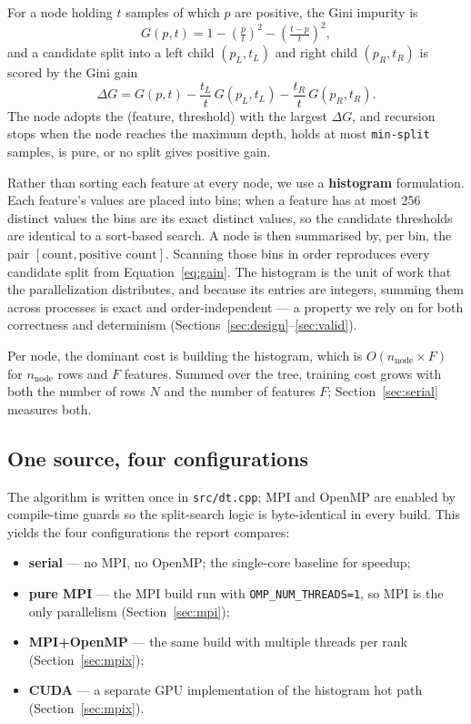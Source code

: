 \documentclass[11pt]{article}
\begin{document}
For a node holding $t$ samples of which $p$ are positive, the Gini impurity is
\begin{equation}
G(p,t) = 1 - \left(\tfrac{p}{t}\right)^2 - \left(\tfrac{t-p}{t}\right)^2 ,
\end{equation}
and a candidate split into a left child $(p_L,t_L)$ and right child $(p_R,t_R)$ is scored by the Gini gain
\begin{equation}
\Delta G = G(p,t) - \frac{t_L}{t}\,G(p_L,t_L) - \frac{t_R}{t}\,G(p_R,t_R).
  \label{eq:gain}
\end{equation}
The node adopts the (feature, threshold) with the largest $\Delta G$, and recursion stops when the node reaches the maximum depth, holds at most \texttt{min-split} samples, is pure, or no split gives positive gain.

Rather than sorting each feature at every node, we use a \textbf{histogram} formulation. Each feature's values are placed into bins; when a feature has at most \num{256} distinct values the bins are its exact distinct values, so the candidate thresholds are identical to a sort-based search. A node is then summarised by, per bin, the pair $[\text{count},\text{positive count}]$. Scanning those bins in order reproduces every candidate split from Equation~\ref{eq:gain}. The histogram is the unit of work that the parallelization distributes, and because its entries are integers, summing them across processes is exact and order-independent --- a property we rely on for both correctness and determinism (Sections~\ref{sec:design}--\ref{sec:valid}).

Per node, the dominant cost is building the histogram, which is $O(n_{\text{node}}\times F)$ for $n_{\text{node}}$ rows and $F$ features. Summed over the tree, training cost grows with both the number of rows $N$ and the number of features $F$; Section~\ref{sec:serial} measures both.

\subsection{One source, four configurations}

The algorithm is written once in \texttt{src/dt.cpp}; MPI and OpenMP are enabled by compile-time guards so the split-search logic is byte-identical in every build. This yields the four configurations the report compares:

\begin{itemize}
  \item \textbf{serial} --- no MPI, no OpenMP; the single-core baseline for speedup;
  \item \textbf{pure MPI} --- the MPI build run with \texttt{OMP\_NUM\_THREADS=1}, so MPI is the only parallelism (Section~\ref{sec:mpi});
  \item \textbf{MPI+OpenMP} --- the same build with multiple threads per rank (Section~\ref{sec:mpix});
  \item \textbf{CUDA} --- a separate GPU implementation of the histogram hot path (Section~\ref{sec:mpix}).
\end{itemize}
\end{document}
